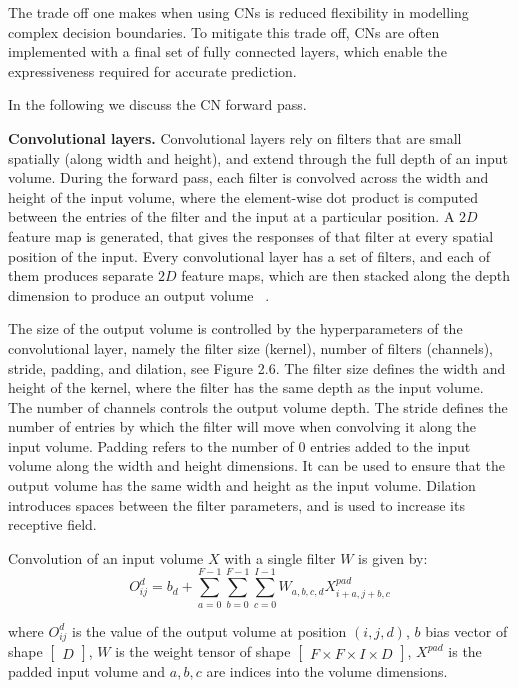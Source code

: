 \noindent The trade off one makes when using CNs is reduced flexibility in modelling complex decision boundaries. To mitigate this trade off, CNs are often implemented with a final set of fully connected layers, which enable the expressiveness required for accurate prediction. \par

\noindent In the following we discuss the CN forward pass. \par

\noindent \textbf{Convolutional layers.} Convolutional layers rely on filters that are small spatially (along width and height), and extend through the full depth of an input volume. During the forward pass, each filter is convolved across the width and height of the input volume, where the element-wise dot product is computed between the entries of the filter and the input at a particular position. A $ 2D $ feature map is generated, that gives the responses of that filter at every spatial position of the input. Every convolutional layer has a set of filters, and each of them produces separate $ 2D $ feature maps, which are then stacked along the depth dimension to produce an output volume \unskip ~\citep{DLIndaba2017}. \par

\noindent  The size of the output volume is controlled by the hyperparameters of the convolutional layer, namely the filter size (kernel), number of filters (channels), stride, padding, and dilation, see Figure 2.6. The filter size defines the width and height of the kernel, where the filter has the same depth as the input volume. The number of channels controls the output volume depth. The stride defines the number of entries by which the filter will move when convolving it along the input volume. Padding refers to the number of $ 0 $ entries added to the input volume along the width and height dimensions. It can be used to ensure that the output volume has the same width and height as the input volume. Dilation introduces spaces between the filter parameters, and is used to increase its receptive field. \par

\noindent Convolution of an input volume $ X $ with a single filter $ W $ is given by: 
\begin{equation}
	O_{ij}^{d} = b_d + \sum_{a=0}^{F - 1}\sum_{b=0}^{F - 1}\sum_{c=0}^{I - 1}W_{a,b,c,d}X_{i+a,j+b,c}^{pad}
\end{equation}

\noindent where $O_{ij}^d$ is the value of the output volume at position $(i,j,d)$, $b$ bias vector of shape $\left [ \begin{matrix} D \end{matrix} \right]$, $W$ is the weight tensor of shape $\left [ \begin{matrix} F \times F \times I \times D \end{matrix} \right]$, $X^{pad}$ is the padded input volume and $a, b, c$ are indices into the volume dimensions. \par

